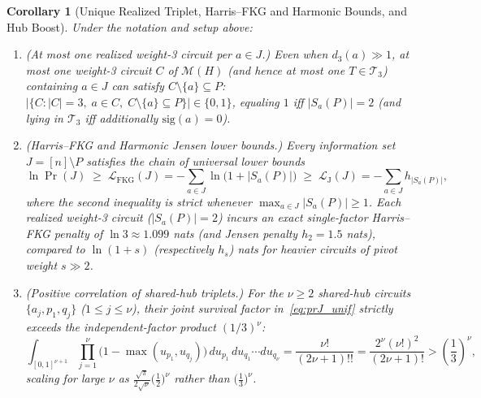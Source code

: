 \documentclass[12pt]{article}
\newtheorem{corollary}{Corollary}
\theoremstyle{definition}
\newcommand{\Tc}{\mathcal{T}_3}
\newcommand{\LH}{\mathcal{L}_{\mathrm{J}}}
\newcommand{\LFKG}{\mathcal{L}_{\mathrm{FKG}}}
\begin{document}
\begin{corollary}[Unique Realized Triplet, Harris--FKG and Harmonic Bounds, and Hub Boost]\label{cor:harmonic_hub}
Under the notation and setup above:
\begin{enumerate}[label=(\alph*)]
  \item \emph{(At most one realized weight-3 circuit per $a \in J$.)} Even when $d_3(a) \gg 1$, at most one
    weight-3 circuit $C$ of $\mathcal{M}(H)$ (and hence at most one $T \in \Tc$) containing $a \in J$ can satisfy
    $C \setminus \{a\} \subseteq P$: $|\{C : |C| = 3,\; a \in C,\; C \setminus \{a\} \subseteq P\}| \in \{0, 1\}$,
    equaling $1$ iff $|S_a(P)| = 2$ (and lying in $\Tc$ iff additionally $\mathrm{sig}(a) = 0$).
  \item \emph{(Harris--FKG and Harmonic Jensen lower bounds.)} Every information set $J = [n] \setminus P$
    satisfies the chain of universal lower bounds
    \begin{equation}\label{eq:fkg_jensen_bounds}
      \ln \Pr(J) \;\ge\; \LFKG(J) = - \sum_{a \in J} \ln\bigl(1 + |S_a(P)|\bigr)
      \;\ge\; \LH(J) = - \sum_{a \in J} h_{|S_a(P)|},
    \end{equation}
    where the second inequality is strict whenever $\max_{a \in J} |S_a(P)| \ge 1$. Each realized weight-3 circuit
    ($|S_a(P)| = 2$) incurs an exact single-factor Harris--FKG penalty of $\ln 3 \approx 1.099$ nats (and Jensen
    penalty $h_2 = 1.5$ nats), compared to $\ln(1 + s)$ (respectively $h_s$) nats for heavier circuits of pivot
    weight $s \gg 2$.
  \item \emph{(Positive correlation of shared-hub triplets.)} For the $\nu \ge 2$ shared-hub circuits
    $\{a_j, p_1, q_j\}$ ($1 \le j \le \nu$), their joint survival factor in~\eqref{eq:prJ_unif} strictly exceeds
    the independent-factor product $(1/3)^\nu$:
    \begin{equation}\label{eq:hub_integral}
      \int_{[0,1]^{\nu+1}} \prod_{j=1}^\nu \bigl(1 - \max(u_{p_1}, u_{q_j})\bigr)\,du_{p_1}\,du_{q_1}\cdots
        du_{q_\nu}
      = \frac{\nu!}{(2\nu + 1)!!} = \frac{2^\nu (\nu!)^2}{(2\nu + 1)!} > \left(\frac{1}{3}\right)^\nu,
    \end{equation}
    scaling for large $\nu$ as $\frac{\sqrt{\pi}}{2\sqrt{\nu}} \bigl(\frac{1}{2}\bigr)^\nu$ rather than
    $\bigl(\frac{1}{3}\bigr)^\nu$.
\end{enumerate}
\end{corollary}
\end{document}
